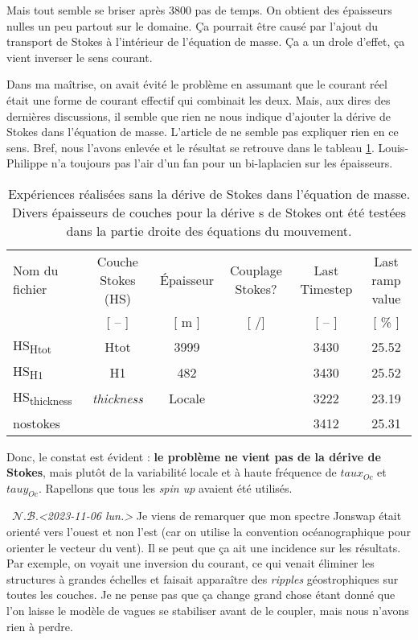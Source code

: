 \documentclass[10pt]{article}
\numberwithin{equation}{section}
\newcommand{\nb}{\raisebox{0.8pt}{\scriptsize\textleaf}\ $\mathscr{N. B.}$\hspace{4pt}}
\newcommand{\cmark}{\ding{52}}
\newcommand{\xmark}{\ding{55}}
\begin{document}
Mais tout semble se briser après 3800 pas de temps.
On obtient des épaisseurs nulles un peu partout sur le domaine.
Ça pourrait être causé par l'ajout du transport de Stokes à l'intérieur de l'équation de masse.
Ça a un drole d'effet, ça vient inverser le sens courant. \bigskip

Dans ma maîtrise, on avait évité le problème en assumant que le courant réel était une forme de courant effectif qui combinait les deux.
Mais, aux dires des dernières discussions, il semble que rien ne nous indique d'ajouter la dérive de Stokes dans l'équation de masse.
L'article de  ne semble pas expliquer rien en ce sens.
Bref, nous l'avons enlevée et le résultat se retrouve dans le tableau \ref{tab:org0598d03}.
Louis-Philippe n'a toujours pas l'air d'un fan pour un bi-laplacien sur les épaisseurs.

\begin{table}[htbp]
\caption{\label{tab:org0598d03}Expériences réalisées sans la dérive de Stokes dans l'équation de masse. Divers épaisseurs de couches pour la dérive s de Stokes ont été testées dans la partie droite des équations du mouvement.}
\centering
\begin{tabular}{lccccc}
\hline
\hline
Nom du fichier & Couche Stokes (HS) & Épaisseur & Couplage Stokes? & Last Timestep & Last ramp value\\[0pt]
[ -- ] & [ -- ] & [ m ] & [ \cmark/\xmark ] & [ -- ] & [ \% ]\\[0pt]
\hline
HS\textsubscript{Htot} & Htot & 3999 & \cmark & 3430 & 25.52\\[0pt]
HS\textsubscript{H1} & H1 & 482 & \cmark & 3430 & 25.52\\[0pt]
HS\textsubscript{thickness} & \emph{thickness} & Locale & \cmark & 3222 & 23.19\\[0pt]
nostokes & \xmark & \xmark & \xmark & 3412 & 25.31\\[0pt]
\hline
\end{tabular}
\end{table}

Donc, le constat est évident : \textbf{le problème ne vient pas de la dérive de Stokes}, mais plutôt de la variabilité locale et à haute fréquence de \(taux_{Oc}\) et \(tauy_{Oc}\).
Rapellons que tous les \emph{spin up} avaient été utilisés. \bigskip

\nb \textit{<2023-11-06 lun.> } Je viens de remarquer que mon spectre Jonswap était orienté vers l'ouest et non l'est (car on utilise la convention océanographique pour orienter le vecteur du vent).
Il se peut que ça ait une incidence sur les résultats.
Par exemple, on voyait une inversion du courant, ce qui venait éliminer les structures à grandes échelles et faisait apparaître des \emph{ripples} géostrophiques sur toutes les couches.
Je ne pense pas que ça change grand chose étant donné que l'on laisse le modèle de vagues se stabiliser avant de le coupler, mais nous n'avons rien à perdre. 
\end{document}
